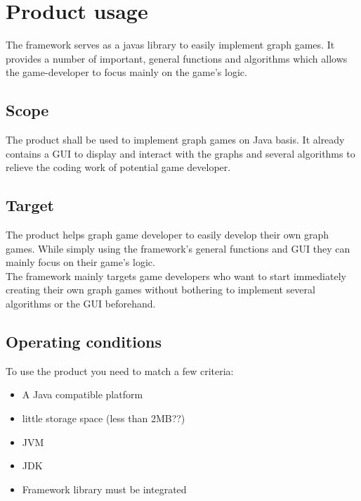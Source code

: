 \section{Product usage}
The \gls{framework} serves as a \glspl{java} \gls{library} to easily implement \gls{graph} games. It provides a number of important, general functions and algorithms which allows the \gls{game-developer} to focus mainly on the game's logic.

\subsection{Scope}
The product shall be used to implement graph games on Java basis. It already contains a \gls{GUI} to display and interact with the graphs and several algorithms to relieve the coding work of potential game developer.

\subsection{Target}
The product helps graph game developer to easily develop their own graph games. While simply using the framework's general functions and \gls{GUI} they can mainly focus on their game's logic. \\
The framework mainly targets game developers who want to start immediately creating their own graph games without bothering to implement several algorithms or the \gls{GUI} beforehand.

\subsection{Operating conditions} 
To use the product you need to match a few criteria:
\begin{itemize}
\item A Java compatible platform
\item little storage space (less than 2MB??)
\item \gls{JVM}
\item \gls{JDK}
\item Framework library must be integrated
\end{itemize}